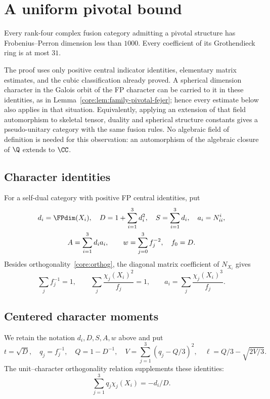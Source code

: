 \section{A uniform pivotal bound}\label{sec:pivotal-bound}

\begin{theorem}\label{pivbd:main}
Every rank-four complex fusion category admitting a pivotal structure
has Frobenius--Perron dimension less than $1000$. Every coefficient of
its Grothendieck ring is at most $31$.
\end{theorem}

The proof uses only positive central indicator identities, elementary
matrix estimates, and the cubic classification already proved.
A spherical dimension character in the Galois orbit of the FP character
can be carried to it in these identities, as in
Lemma~\ref{core:lem:family-pivotal-fejer}; hence every estimate below
also applies in that situation. Equivalently, applying an extension of
that field automorphism to skeletal tensor, duality and spherical
structure constants gives a pseudo-unitary category with the same
fusion rules. No algebraic field of definition is needed for this
observation: an automorphism of the algebraic closure of $\Q$
extends to $\CC$.

\subsection{Character identities}

For a self-dual category with positive FP central identities, put
\[
\begin{gathered}
 d_i=\FPdim(X_i),\quad D=1+\sum_{i=1}^3d_i^2,\quad
 S=\sum_{i=1}^3d_i,\quad a_i=N_{ii}^i,\\
 A=\sum_{i=1}^3d_ia_i,\qquad
 w=\sum_{j=0}^3f_j^{-2},\quad f_0=D.
\end{gathered}
\]
Besides orthogonality~\eqref{core:orthog}, the diagonal matrix coefficient
of $N_{X_i}$ gives
\begin{equation}\label{pivbd:eq:short-character-identities}
 \sum_jf_j^{-1}=1,\qquad
 \sum_j\frac{\chi_j(X_i)^2}{f_j}=1,\qquad
 a_i=\sum_j\frac{\chi_j(X_i)^3}{f_j}.
\end{equation}
\subsection{Centered character moments}

We retain the notation $d_i,D,S,A,w$ above and put
\[
 t=\sqrt D,\quad q_j=f_j^{-1},\quad Q=1-D^{-1},\quad
 V=\sum_{j=1}^3(q_j-Q/3)^2,\quad
 \ell=Q/3-\sqrt{2V/3}.
\]
The unit--character orthogonality relation supplements these
identities:
\[
 \sum_{j=1}^3q_j\chi_j(X_i)=-d_i/D.
\]

